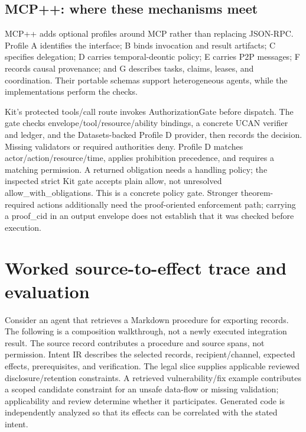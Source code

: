 \documentclass{article}
\begin{document}
\subsection{MCP++: where these mechanisms meet}

MCP++ adds optional profiles around MCP rather than replacing JSON-RPC. Profile A identifies the interface; B binds invocation and result artifacts; C specifies delegation; D carries temporal-deontic policy; E carries P2P messages; F records causal provenance; and G describes tasks, claims, leases, and coordination. Their portable schemas support heterogeneous agents, while the implementations perform the checks.

Kit's protected tools/call route invokes AuthorizationGate before dispatch. The gate checks envelope/tool/resource/ability bindings, a concrete UCAN verifier and ledger, and the Datasets-backed Profile D provider, then records the decision. Missing validators or required authorities deny. Profile D matches actor/action/resource/time, applies prohibition precedence, and requires a matching permission. A returned obligation needs a handling policy; the inspected strict Kit gate accepts plain allow, not unresolved allow\_\allowbreak{}with\_\allowbreak{}obligations. This is a concrete policy gate. Stronger theorem-required actions additionally need the proof-oriented enforcement path; carrying a proof\_\allowbreak{}cid in an output envelope does not establish that it was checked before execution.

\section{Worked source-to-effect trace and evaluation}

Consider an agent that retrieves a Markdown procedure for exporting records. The following is a composition walkthrough, not a newly executed integration result. The source record contributes a procedure and source spans, not permission. Intent IR describes the selected records, recipient/channel, expected effects, prerequisites, and verification. The legal slice supplies applicable reviewed disclosure/retention constraints. A retrieved vulnerability/fix example contributes a scoped candidate constraint for an unsafe data-flow or missing validation; applicability and review determine whether it participates. Generated code is independently analyzed so that its effects can be correlated with the stated intent.
\end{document}
